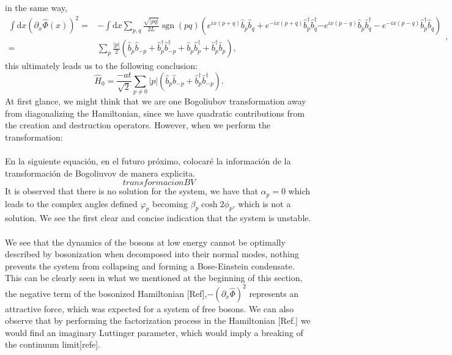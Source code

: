 in the same way,
\footnotesize
\begin{equation}
    \begin{aligned}
        \int \mathrm{d} x\left(\partial_{x} \hat{\Phi} (x)\right)^{2}= & -\int \mathrm{d} x \sum_{p, q} \frac{\sqrt{|p q|}}{2 L} \operatorname{sgn}(p q)\left(e^{i x(p+q)} \hat{b}_{p} \hat{b}_{q}+e^{-i x(p+q)} \hat{b}_{p}^{\dagger} \hat{b}_{q}^{\dagger}\right.  \left.-e^{i x(p-q)} \hat{b}_{p} \hat{b}_{q}^{\dagger}-e^{-i x(p-q)} \hat{b}_{p}^{\dagger} \hat{b}_{q}\right) \\
= & \sum_{p} \frac{|p|}{2}\left(\hat{b}_{p} \hat{b}_{-p}+\hat{b}_{p}^{\dagger} \hat{b}_{-p}^{\dagger}+\hat{b}_{p} \hat{b}_{p}^{\dagger}+\hat{b}_{p}^{\dagger} \hat{b}_{p}\right),
    \end{aligned},
\end{equation}
\normalsize
this ultimately leads us to the following conclusion:
\begin{equation}
\hat{H}_{0}=\frac{-a t}{\sqrt{2}} \sum_{p \neq 0}|p|\left(\hat{b}_{p} \hat{b}_{-p}+\hat{b}_{p}^{\dagger} \hat{b}_{-p}^{\dagger}\right). 
\end{equation}
At first glance, we might think that we are one Bogoliubov transformation away from diagonalizing the Hamiltonian, since we have quadratic contributions from the creation and destruction operators. However, when we perform the transformation:\\ \\
\textcolor{myred}{En la siguiente equación, en el futuro próximo, colocaré la información de la transformación de Bogoliuvov de manera explicita.}
\begin{equation}
    transformacionBV
\end{equation}
It is observed that there is no solution for the system, we have that $\alpha_{p}=0$ which leads to the complex angles defined $\varphi_{p}$ becoming $\beta_{p} \cosh{2\phi_{p}}$, which is not a solution. We see the first clear and concise indication that the system is unstable.\\ \\
We see that the dynamics of the bosons at low energy cannot be optimally described by bosonization when decomposed into their normal modes, nothing prevents the system from collapsing and forming a Bose-Einstein condensate. This can be clearly seen in what we mentioned at the beginning of this section, the negative term of the bosonized Hamiltonian [Ref],$-(\partial_{x} \hat{\Phi})^{2}$ represents an attractive force, which was expected for a system of free bosons. We can also observe that by performing the factorization process in the Hamiltonian [Ref.] we would find an imaginary Luttinger parameter, which would imply a breaking of the continuum limit[refe]. \\ \\
